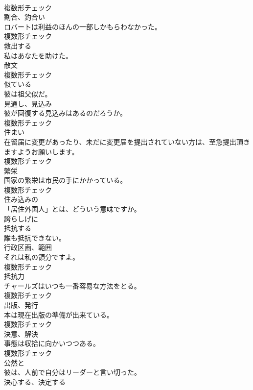 \documentclass[8pt]{extreport}
\begin{document}
\begin{CJK}{UTF8}{min}
\\	複数形チェック
\\	[名詞]	割合、釣合い	
\\	ロバートは利益のほんの一部しかもらわなかった。	
\\	複数形チェック
\\	[動詞]	救出する	
\\	私はあなたを助けた。	
\\	[名詞]	散文	
\\	複数形チェック
\\	[動詞]	似ている	
\\	彼は祖父似だ。	
\\	[名詞]	見通し、見込み	
\\	彼が回復する見込みはあるのだろうか。	
\\	複数形チェック
\\	[名詞]	住まい	
\\	在留届に変更があったり、未だに変更届を提出されていない方は、至急提出頂きますようお願いします。	
\\	複数形チェック
\\	[名詞]	繁栄	
\\	国家の繁栄は市民の手にかかっている。	
\\	複数形チェック
\\	[形容詞]	住み込みの	
\\	「居住外国人」とは、どういう意味ですか。	
\\	[副詞]	誇らしげに	
\\	[動詞]	抵抗する	
\\	誰も抵抗できない。	
\\	[名詞]	行政区画、範囲	
\\	それは私の領分ですよ。	
\\	複数形チェック
\\	[名詞]	抵抗力	
\\	チャールズはいつも一番容易な方法をとる。	
\\	複数形チェック
\\	[名詞]	出版、発行	
\\	本は現在出版の準備が出来ている。	
\\	複数形チェック
\\	[名詞]	決意、解決	
\\	事態は収拾に向かいつつある。	
\\	複数形チェック
\\	[副詞]	公然と	
\\	彼は、人前で自分はリーダーと言い切った。	
\\	[動詞]	決心する、決定する	

\end{CJK}
\end{document}
